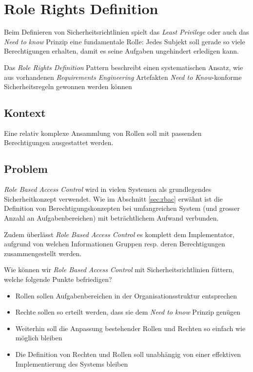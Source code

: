 \section{Role Rights Definition}
Beim Definieren von Sicherheitsrichtlinien spielt das \emph{Least Privilege} oder auch das \emph{Need to know} Prinzip eine fundamentale Rolle: Jedes Subjekt soll gerade so viele Berechtigungen erhalten, damit es seine Aufgaben ungehindert erledigen kann.

Das \emph{Role Rights Definition} Pattern beschreibt einen systematischen Ansatz, wie aus vorhandenen \emph{Requirements Engineering} Artefakten \emph{Need to Know}-konforme Sicherheitsregeln gewonnen werden können

\subsection*{Kontext}
Eine relativ komplexe Ansammlung von Rollen soll mit passenden Berechtigungen ausgestattet werden.

\subsection*{Problem}
\emph{Role Based Access Control} wird in vielen Systemen als grundlegendes Sicherheitkonzept verwendet. Wie im Abschnitt \ref{sec:rbac} erwähnt ist die Definition von Berechtigungskonzepten bei umfangreichen System (und grosser Anzahl an Aufgabenbereichen) mit beträchtlichem Aufwand verbunden.

Zudem überlässt \emph{Role Based Access Control} es komplett dem Implementator, aufgrund von welchen Informationen Gruppen resp. deren Berechtigungen zusammengestellt werden.


Wie können wir \emph{Role Based Access Control} mit Sicherheitsrichtlinien füttern, welche folgende Punkte befriedigen?
\begin{itemize}
	\item Rollen sollen Aufgabenbereichen in der Organisationsstruktur entsprechen
	\item Rechte sollen so erteilt werden, dass sie dem \emph{Need to know} Prinzip genügen
	\item Weiterhin soll die Anpassung bestehender Rollen und Rechten so einfach wie möglich bleiben
	\item Die Definition von Rechten und Rollen soll unabhängig von einer effektiven Implementierung des Systems bleiben
\end{itemize}


